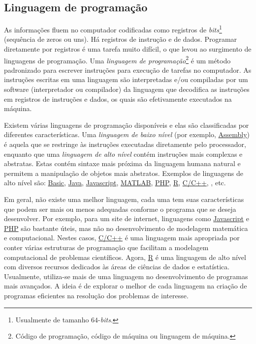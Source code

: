 \subsection{Linguagem de programação}

As informações fluem no computador codificadas como registros de {\it bits}\footnote{Usualmente de tamanho $64$-{\it bits}.} (sequência de zeros ou uns). Há registros de instrução e de dados. Programar diretamente por registros é uma tarefa muito difícil, o que levou ao surgimento de linguagens de programação. Uma \emph{linguagem de programação}\footnote{Código de programação, código de máquina ou linguagem de máquina.} é um método padronizado para escrever instruções para execução de tarefas no computador. As instruções escritas em uma linguagem são interpretadas e/ou compiladas por um software (interpretador ou compilador) da linguagem que decodifica as instruções em registros de instruções e dados, os quais são efetivamente executados na máquina.

Existem várias linguagens de programação disponíveis e elas são classificadas por diferentes características. Uma \emph{linguagem de baixo nível} (por exemplo, \href{https://pt.wikipedia.org/wiki/Linguagem_assembly}{Assembly}) é aquela que se restringe às instruções executadas diretamente pelo processador, enquanto que uma \emph{linguagem de alto nível} contém instruções mais complexas e abstratas. Estas contém sintaxe mais próxima da linguagem humana natural e permitem a manipulação de objetos mais abstratos. Exemplos de linguagens de alto nível são: \href{https://pt.wikipedia.org/wiki/BASIC}{Basic}, \href{https://pt.wikipedia.org/wiki/Java\_(linguagem\_de\_programa\%C3\%A7\%C3\%A3o)}{Java}, \href{https://pt.wikipedia.org/wiki/JavaScript}{Javascript}, \href{https://pt.wikipedia.org/wiki/MATLAB}{MATLAB}, \href{https://pt.wikipedia.org/wiki/PHP}{PHP}, \href{https://pt.wikipedia.org/wiki/R\_(linguagem_de_programa\%C3\%A7\%C3\%A3o)}{R}, \href{https://pt.wikipedia.org/wiki/C\%2B\%2B}{C/C++}, {\python}, etc.

Em geral, não existe uma melhor linguagem, cada uma tem suas características que podem ser mais ou menos adequadas conforme o programa que se deseja desenvolver. Por exemplo, para um site de internet, linguagens como \href{https://pt.wikipedia.org/wiki/JavaScript}{Javascript} e \href{https://pt.wikipedia.org/wiki/PHP}{PHP} são bastante úteis, mas não no desenvolvimento de modelagem matemática e computacional. Nestes casos, \href{https://pt.wikipedia.org/wiki/C\%2B\%2B}{C/C++} é uma linguagem mais apropriada por conter várias estruturas de programação que facilitam a modelagem computacional de problemas científicos. Agora, \href{https://pt.wikipedia.org/wiki/R\_(linguagem_de_programa\%C3\%A7\%C3\%A3o)}{R} é uma linguagem de alto nível com diversos recursos dedicados às áreas de ciências de dados e estatística. Usualmente, utiliza-se mais de uma linguagem no desenvolvimento de programas mais avançados. A ideia é de explorar o melhor de cada linguagem na criação de programas eficientes na resolução dos problemas de interesse.


